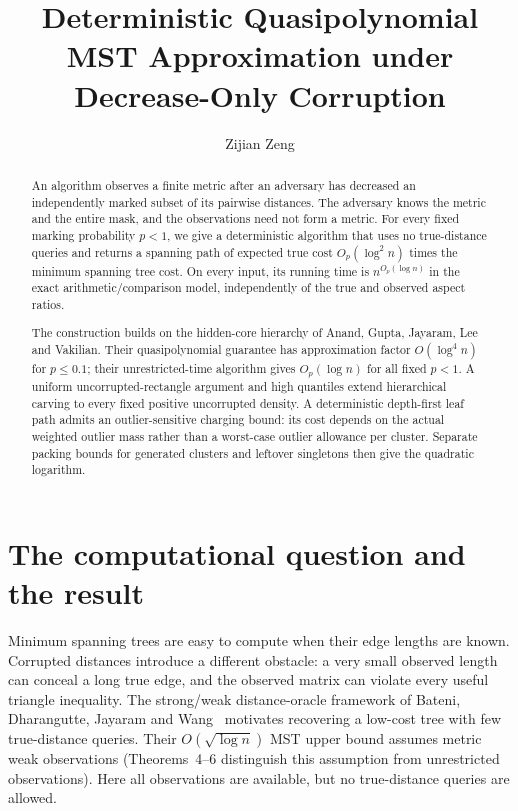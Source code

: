 \documentclass[acmsmall,11pt,nonacm]{acmart}
\title[Deterministic MST Approximation under Decrease-Only Corruption]{Deterministic Quasipolynomial MST Approximation under Decrease-Only Corruption}
\author{Zijian Zeng}
\affiliation{\institution{UCSI University}\country{Malaysia}}
\date{}
\theoremstyle{definition}
\begin{document}
\begin{abstract}
An algorithm observes a finite metric after an adversary has decreased an
independently marked subset of its pairwise distances. The adversary knows
the metric and the entire mask, and the observations need not form a metric.
For every fixed marking probability $p<1$, we give a deterministic algorithm
that uses no true-distance queries and returns a spanning path of expected
true cost $O_p(\log^2 n)$ times the minimum spanning tree cost. On every input,
its running time is $n^{O_p(\log n)}$ in the exact arithmetic/comparison model,
independently of the true and observed aspect ratios.

The construction builds on the hidden-core hierarchy of Anand, Gupta,
Jayaram, Lee and Vakilian. Their quasipolynomial guarantee has approximation
factor $O(\log^4 n)$ for $p\leq0.1$; their unrestricted-time algorithm gives
$O_p(\log n)$ for all fixed $p<1$. A uniform uncorrupted-rectangle argument
and high quantiles extend hierarchical carving to every fixed positive
uncorrupted density. A deterministic depth-first leaf path admits an
outlier-sensitive charging bound: its cost depends on the actual weighted
outlier mass rather than a worst-case outlier allowance per cluster.
Separate packing bounds for generated clusters and leftover singletons
then give the quadratic logarithm.
\end{abstract}
\maketitle
\clearpage

\section{The computational question and the result}

Minimum spanning trees are easy to compute when their edge lengths are
known. Corrupted distances introduce a different obstacle: a very small
observed length can conceal a long true edge, and the observed matrix can
violate every useful triangle inequality. The strong/weak distance-oracle
framework of Bateni, Dharangutte, Jayaram and Wang~\cite{bateni2024}
motivates recovering a low-cost tree with few true-distance queries.
Their $O(\sqrt{\log n})$ MST upper bound assumes metric weak observations
(Theorems~4--6 distinguish this assumption from unrestricted observations).
Here all observations are available, but no true-distance queries are allowed.
\end{document}
